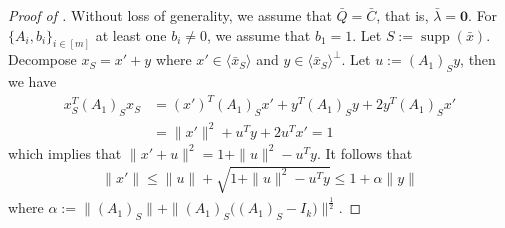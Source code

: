 \documentclass[11pt]{amsart}
\theoremstyle{plain}
\theoremstyle{definition}
\theoremstyle{remark}
\newcommand{\vzero}{\mathbf{0}}
\DeclareMathOperator{\supp}{supp}
\begin{document}
\begin{appendices}
        \begin{proof}[Proof of ]
        Without loss of generality, we assume that \(\bar Q = \bar C\), that is, \(\bar\lambda = \vzero\). For \(\{A_i,b_i\}_{i\in[m]}\) at least one \(b_i \neq 0\), we assume that \(b_1=1\). Let \(S:=\supp(\bar x)\). Decompose \(x_S = x' + y\) where \(x'\in \langle\bar x_S\rangle\) and \( y \in \langle\bar x_S\rangle^\perp\). Let \(u:= (A_1)_Sy\), then we have
        \begin{equation}
        \begin{split}
             x_S^T (A_1)_S x_S &= (x')^T(A_1)_S x' + y^T(A_1)_Sy + 2 y^T (A_1)_S x' \\
                       &= \|x'\|^2 + u^T y + 2 u^T x' = 1
        \end{split}
        \end{equation}
        which implies that \( \|x' + u\|^2 = 1 + \|u\|^2 - u^Ty \). It follows that
        \begin{equation}
            \begin{split}
                \|x'\| \leq \|u\| + \sqrt{1 + \|u\|^2 - u^Ty}\leq 1 + \alpha\|y\|
            \end{split}
        \end{equation}
        where \(\alpha:= \|(A_1)_S\| + \|(A_1)_S\big((A_1)_S-I_k\big)\|^{\tfrac{1}{2}}\). 
        

\end{proof}
\end{appendices}
\end{document}
